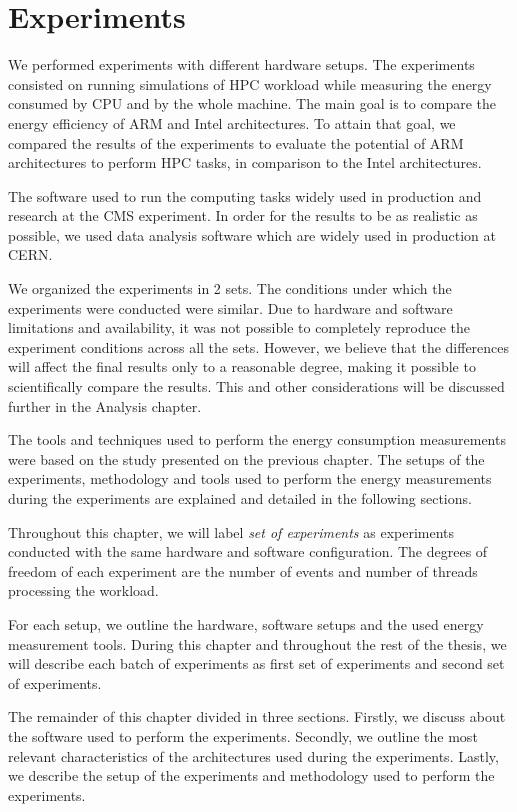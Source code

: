 \chapter{Experiments}


We performed experiments with different hardware setups. The experiments consisted on running simulations of HPC workload while measuring the energy consumed by CPU and by the whole machine.
The main goal is to compare the energy efficiency of ARM and Intel architectures. To attain that goal, we compared the results
of the experiments to evaluate the potential of ARM architectures to perform HPC tasks, in
comparison to the Intel architectures.

The software used to run the computing tasks
widely used in production and research at the CMS experiment. In order for the results to be as realistic as possible, we used data analysis software which are widely used in production at CERN.

We organized the experiments in 2 sets. The conditions under which the
experiments were conducted were similar. Due to hardware and software
limitations and availability, it was not possible to completely reproduce the experiment
conditions across all the sets. However, we believe that the differences will
affect the final results only to a reasonable degree, making it possible to scientifically compare the results. This and other considerations will be discussed further in the Analysis chapter. 

The tools and techniques used to perform the energy
consumption measurements were based on the study presented on the previous
chapter. The setups of the experiments, methodology and tools used to perform the energy
measurements during the experiments are explained and detailed in the following
sections.

Throughout this chapter, we will label \textit{set of experiments} as experiments conducted with
the same hardware and software configuration. The degrees of freedom of each
experiment are the number of events and number of threads processing the workload.
 
For each setup, we outline the hardware, software setups and the used energy measurement tools. 
During this chapter and throughout the rest of the thesis, we will describe
each batch of experiments as first set of experiments and second set of experiments.

The remainder of this chapter divided in three sections. Firstly, we discuss about the software used to perform the experiments. Secondly, we outline the most relevant characteristics of the
architectures used during the experiments. Lastly, we describe
the setup of the experiments and methodology used to perform the experiments. 

